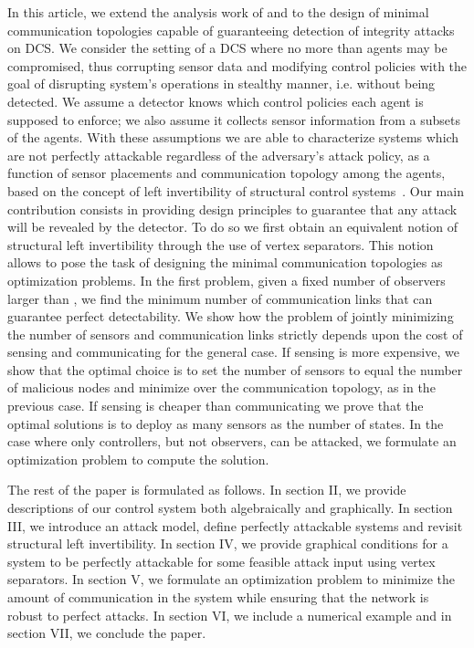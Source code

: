 \documentclass[letterpaper, 10 pt, conference]{ieeeconf}
\begin{document}
In this article, we extend the analysis work of \cite{Cam2014} and \cite{PasqualettiAttack} to the design of minimal communication topologies capable of guaranteeing detection of integrity attacks on DCS. We consider the setting of a DCS where no more than  agents may be compromised, thus corrupting sensor data and modifying control policies with the goal of disrupting system's operations in stealthy manner, i.e. without being detected. We assume a detector knows which control policies each agent is supposed to enforce; we also assume it collects sensor information from a subsets of the agents. With these assumptions we are able to characterize systems which are not perfectly attackable regardless of the adversary's attack policy, as a function of sensor placements and communication topology among the agents, based on the concept of left invertibility of structural control systems~\cite{Cam2014, PasqualettiAttack}. Our main contribution consists in providing design principles to guarantee that any attack will be revealed by the detector. To do so we first obtain an equivalent notion of structural left invertibility through the use of vertex separators. This notion allows to pose the task of designing the minimal communication topologies as optimization problems. In the first problem, given a fixed number of observers larger than , we find the minimum number of communication links that can guarantee perfect detectability. We show how the  problem of jointly minimizing the number of sensors and communication links strictly depends upon the cost of sensing and communicating for the general case. If sensing is more expensive, we show that the optimal choice is to set the number of sensors to equal the number of malicious nodes  and minimize over the communication topology, as in the previous case. If sensing is cheaper than communicating we prove that the optimal solutions is to deploy as many sensors as the number of states. In the case where only controllers, but not observers, can be attacked, we formulate an optimization problem to compute the solution.


The rest of the paper is formulated as follows. In section II, we provide descriptions of our control system both algebraically and graphically. In section III, we introduce an attack model, define perfectly attackable systems and revisit structural left invertibility. In section IV, we provide graphical conditions for a system to be perfectly attackable for some feasible attack input using vertex separators. In section V, we formulate an optimization problem to minimize the amount of communication in the system while ensuring that the network is robust to perfect attacks. In section VI, we include a numerical example and in section VII, we conclude the paper.
\end{document}
